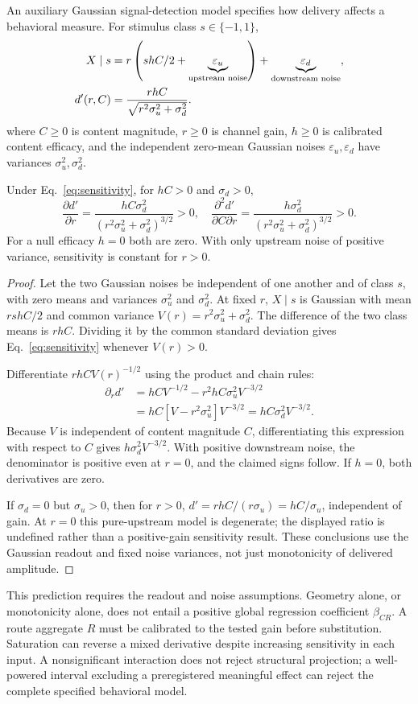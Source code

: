 \documentclass[submission,nolinenumbers]{esj}
\begin{document}
An auxiliary Gaussian signal-detection model specifies how delivery affects a behavioral measure. For stimulus class $s\in\{-1,1\}$,
\begin{align}
X\mid s&=r\left(shC/2+\underbrace{\varepsilon_u}_{\text{upstream noise}}\right)
+\underbrace{\varepsilon_d}_{\text{downstream noise}},\notag\\
d'(r,C)&=\frac{rhC}{\sqrt{r^2\sigma_u^2+\sigma_d^2}}.\label{eq:sensitivity}
\end{align}
where $C\ge0$ is content magnitude, $r\ge0$ is channel gain, $h\ge0$ is calibrated content efficacy, and the independent zero-mean Gaussian noises $\varepsilon_u,\varepsilon_d$ have variances $\sigma_u^2,\sigma_d^2$.
\begin{corollary}\label{cor:contentrouting}
Under Eq.~\eqref{eq:sensitivity}, for $hC>0$ and $\sigma_d>0$,
\[
\frac{\partial d'}{\partial r}=\frac{hC\sigma_d^2}{(r^2\sigma_u^2+\sigma_d^2)^{3/2}}>0,
\quad
\frac{\partial^2d'}{\partial C\partial r}=\frac{h\sigma_d^2}{(r^2\sigma_u^2+\sigma_d^2)^{3/2}}>0.
\]
For a null efficacy $h=0$ both are zero. With only upstream noise of positive variance, sensitivity is constant for $r>0$.
\end{corollary}
\begin{proof}
Let the two Gaussian noises be independent of one another and of class $s$, with zero means and variances $\sigma_u^2$ and $\sigma_d^2$. At fixed $r$, $X\mid s$ is Gaussian with mean $rshC/2$ and common variance $V(r)=r^2\sigma_u^2+\sigma_d^2$. The difference of the two class means is $rhC$. Dividing it by the common standard deviation gives Eq.~\eqref{eq:sensitivity} whenever $V(r)>0$.

Differentiate $rhC V(r)^{-1/2}$ using the product and chain rules:
\begin{align*}
\partial_r d'&=hC V^{-1/2}-r^2hC\sigma_u^2V^{-3/2}\\
&=hC[V-r^2\sigma_u^2]V^{-3/2}
=hC\sigma_d^2V^{-3/2}.
\end{align*}
Because $V$ is independent of content magnitude $C$, differentiating this expression with respect to $C$ gives $h\sigma_d^2V^{-3/2}$. With positive downstream noise, the denominator is positive even at $r=0$, and the claimed signs follow. If $h=0$, both derivatives are zero.

If $\sigma_d=0$ but $\sigma_u>0$, then for $r>0$, $d'=rhC/(r\sigma_u)=hC/\sigma_u$, independent of gain. At $r=0$ this pure-upstream model is degenerate; the displayed ratio is undefined rather than a positive-gain sensitivity result. These conclusions use the Gaussian readout and fixed noise variances, not just monotonicity of delivered amplitude.
\end{proof}
This prediction requires the readout and noise assumptions. Geometry alone, or monotonicity alone, does not entail a positive global regression coefficient $\beta_{CR}$. A route aggregate $R$ must be calibrated to the tested gain before substitution. Saturation can reverse a mixed derivative despite increasing sensitivity in each input. A nonsignificant interaction does not reject structural projection; a well-powered interval excluding a preregistered meaningful effect can reject the complete specified behavioral model.
\end{document}
